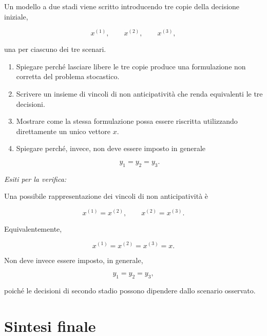 \begin{exercise}

\label{ex:cap14-proposto-nonanticipativita}

Un modello a due stadi viene scritto introducendo tre copie della decisione
iniziale,

\[
x^{(1)},
\qquad
x^{(2)},
\qquad
x^{(3)},
\]

\noindent una per ciascuno dei tre scenari.

\begin{enumerate}

\item Spiegare perch\'e lasciare libere le tre copie produce una formulazione
non corretta del problema stocastico.

\item Scrivere un insieme di vincoli di non anticipativit\`a che renda
equivalenti le tre decisioni.

\item Mostrare come la stessa formulazione possa essere riscritta utilizzando
direttamente un unico vettore $x$.

\item Spiegare perch\'e, invece, non deve essere imposto in generale

\[
y_1=y_2=y_3.
\]

\end{enumerate}

\medskip

\noindent
\textit{Esiti per la verifica:}

Una possibile rappresentazione dei vincoli di non anticipativit\`a \`e

\[
x^{(1)}=x^{(2)},
\qquad
x^{(2)}=x^{(3)}.
\]

Equivalentemente,

\[
x^{(1)}
=
x^{(2)}
=
x^{(3)}
=
x.
\]

Non deve invece essere imposto, in generale,

\[
y_1=y_2=y_3,
\]

\noindent poich\'e le decisioni di secondo stadio possono dipendere dallo scenario
osservato.

\end{exercise}

\section{Sintesi finale}

\label{sec:cap14-sintesi-finale}

